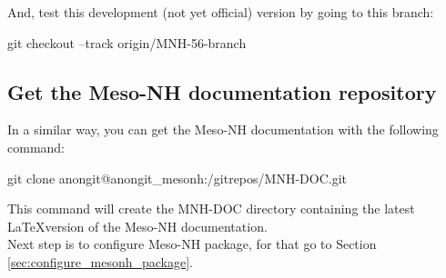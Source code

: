 And, test this development (not yet official) version by going to this branch:
\begin{bashcode}
git checkout --track origin/MNH-56-branch
\end{bashcode}

\subsection{Get the Meso-NH documentation repository}

In a similar way, you can get the Meso-NH documentation with the following command:
\begin{bashcode}
git clone anongit@anongit_mesonh:/gitrepos/MNH-DOC.git
\end{bashcode}

This command will create the MNH-DOC directory containing the latest \LaTeX version of the Meso-NH documentation. \\

Next step is to configure Meso-NH package, for that go to Section \ref{sec:configure_mesonh_package}.

 